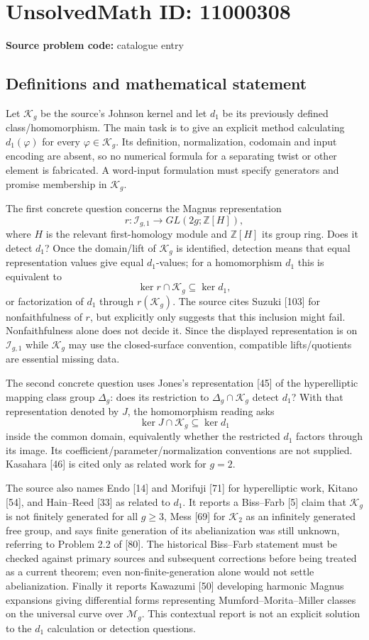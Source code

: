 \documentclass[11pt]{article}
\newcommand{\Z}{\mathbb{Z}}
\begin{document}
\section*{UnsolvedMath ID: 11000308}
\textbf{Source problem code:} catalogue entry
\subsection{Definitions and mathematical statement}
Let \(\mathcal K_g\) be the source's Johnson kernel and let \(d_1\) be its previously defined class/homomorphism. The main task is to give an explicit method calculating \(d_1(\varphi)\) for every \(\varphi\in\mathcal K_g\). Its definition, normalization, codomain and input encoding are absent, so no numerical formula for a separating twist or other element is fabricated. A word-input formulation must specify generators and promise membership in \(\mathcal K_g\).

The first concrete question concerns the Magnus representation
\[r:\mathcal I_{g,1}\to GL(2g;\Z[H]),\]
where \(H\) is the relevant first-homology module and \(\Z[H]\) its group ring. Does it detect \(d_1\)? Once the domain/lift of \(\mathcal K_g\) is identified, detection means that equal representation values give equal \(d_1\)-values; for a homomorphism \(d_1\) this is equivalent to
\[\ker r\cap\mathcal K_g\subseteq\ker d_1,\]
or factorization of \(d_1\) through \(r(\mathcal K_g)\). The source cites Suzuki [103] for nonfaithfulness of \(r\), but explicitly only suggests that this inclusion might fail. Nonfaithfulness alone does not decide it. Since the displayed representation is on \(\mathcal I_{g,1}\) while \(\mathcal K_g\) may use the closed-surface convention, compatible lifts/quotients are essential missing data.

The second concrete question uses Jones's representation [45] of the hyperelliptic mapping class group \(\Delta_g\): does its restriction to \(\Delta_g\cap\mathcal K_g\) detect \(d_1\)? With that representation denoted by \(J\), the homomorphism reading asks
\[\ker J\cap\mathcal K_g\subseteq\ker d_1\]
inside the common domain, equivalently whether the restricted \(d_1\) factors through its image. Its coefficient/parameter/normalization conventions are not supplied. Kasahara [46] is cited only as related work for \(g=2\).

The source also names Endo [14] and Morifuji [71] for hyperelliptic work, Kitano [54], and Hain--Reed [33] as related to \(d_1\). It reports a Biss--Farb [5] claim that \(\mathcal K_g\) is not finitely generated for all \(g\geq3\), Mess [69] for \(\mathcal K_2\) as an infinitely generated free group, and says finite generation of its abelianization was still unknown, referring to Problem 2.2 of [80]. The historical Biss--Farb statement must be checked against primary sources and subsequent corrections before being treated as a current theorem; even non-finite-generation alone would not settle abelianization. Finally it reports Kawazumi [50] developing harmonic Magnus expansions giving differential forms representing Mumford--Morita--Miller classes on the universal curve over \(\mathcal M_g\). This contextual report is not an explicit solution to the \(d_1\) calculation or detection questions.
\end{document}
